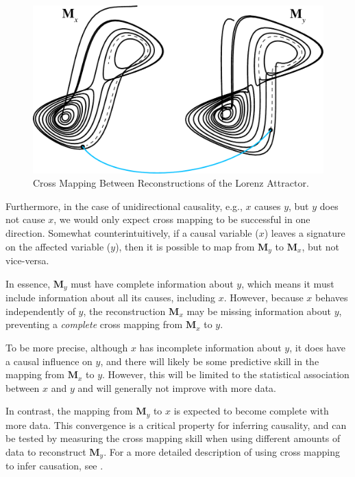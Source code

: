 \documentclass[article]{jss}
\begin{document}
\begin{figure}[t!]
\begin{center}
\includegraphics{figure_3}
\end{center}
\caption{\label{fig:cross-mapping} Cross Mapping Between Reconstructions of the Lorenz Attractor.}
\end{figure}

Furthermore, in the case of unidirectional causality, e.g., $x$ causes $y$, but $y$ does not cause $x$, we would only expect cross mapping to be successful in one direction. Somewhat counterintuitively, if a causal variable ($x$) leaves a signature on the affected variable ($y$), then it is possible to map from $\mathbf{M}_y$ to $\mathbf{M}_x$, but not vice-versa.

In essence, $\mathbf{M}_y$ must have complete information about $y$, which means it must include information about all its causes, including $x$. However, because $x$ behaves independently of $y$, the reconstruction $\mathbf{M}_x$ may be missing information about $y$, preventing a \emph{complete} cross mapping from $\mathbf{M}_x$ to $y$.

To be more precise, although $x$ has incomplete information about $y$, it does have a causal influence on $y$, and there will likely be some predictive skill in the mapping from $\mathbf{M}_x$ to $y$. However, this will be limited to the statistical association between $x$ and $y$ and will generally not improve with more data.

In contrast, the mapping from $\mathbf{M}_y$ to $x$ is expected to become complete with more data. This convergence is a critical property for inferring causality, and can be tested by measuring the cross mapping skill when using different amounts of data to reconstruct $\mathbf{M}_y$. For a more detailed description of using cross mapping to infer causation, see \citet{Sugihara_2012, Ye_2015a}.
\end{document}
